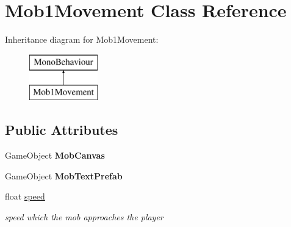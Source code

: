\hypertarget{class_mob1_movement}{}\section{Mob1\+Movement Class Reference}
\label{class_mob1_movement}
Inheritance diagram for Mob1\+Movement\+:\begin{figure}[H]
\begin{center}
\leavevmode
\includegraphics[height=2.000000cm]{class_mob1_movement}
\end{center}
\end{figure}
\subsection*{Public Attributes}
\begin{DoxyCompactItemize}
\item 
\mbox{\label{class_mob1_movement_a60cea12c3ca0514b7fa3bdd78fccc257}} 
Game\+Object {\bfseries Mob\+Canvas}
\item 
\mbox{\label{class_mob1_movement_a90c9578db347384411e4ad1f8ecd0133}} 
Game\+Object {\bfseries Mob\+Text\+Prefab}
\item 
\mbox{\label{class_mob1_movement_aa5d29d107c8b3c137f630e80c06a6f30}} 
float \hyperlink{class_mob1_movement_aa5d29d107c8b3c137f630e80c06a6f30}{speed}
\begin{DoxyCompactList}\small\item\em speed which the mob approaches the player \end{DoxyCompactList}\end{DoxyCompactItemize}
